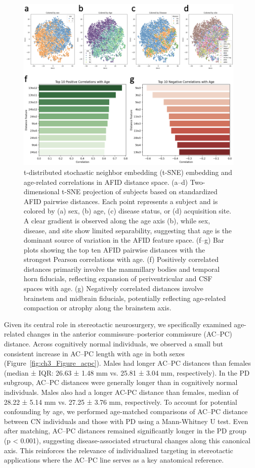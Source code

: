 \begin{figure}[hbt!]
    \centering
    \includegraphics[width=1\linewidth]{figs/ch3_Figure_tsne.png}
    \caption{t-distributed stochastic neighbor embedding (t-SNE) embedding and age-related correlations in AFID distance space. (a–d) Two-dimensional t-SNE projection of subjects based on standardized AFID pairwise distances. Each point represents a subject and is colored by (a) sex, (b) age, (c) disease status, or (d) acquisition site. A clear gradient is observed along the age axis (b), while sex, disease, and site show limited separability, suggesting that age is the dominant source of variation in the AFID feature space. (f–g) Bar plots showing the top ten AFID pairwise distances with the strongest Pearson correlations with age. (f) Positively correlated distances primarily involve the mammillary bodies and temporal horn fiducials, reflecting expansion of periventricular and CSF spaces with age. (g) Negatively correlated distances involve brainstem and midbrain fiducials, potentially reflecting age-related compaction or atrophy along the brainstem axis.
    }
    \label{fig:ch3_Figure_tsne}
\end{figure}

Given its central role in stereotactic neurosurgery, we specifically examined age-related changes in the anterior commissure–posterior commissure (AC–PC) distance. Across cognitively normal individuals, we observed a small but consistent increase in AC–PC length with age in both sexes (Figure~\ref{fig:ch3_Figure_acpc}). Males had longer AC–PC distances than females (median ± IQR: 26.63 ± 1.48 mm vs. 25.81 ± 3.04 mm, respectively). In the PD subgroup, AC–PC distances were generally longer than in cognitively normal individuals. Males also had a longer AC-PC distance than females, median of 28.22 ± 5.14 mm vs. 27.25 ± 3.76 mm, respectively. To account for potential confounding by age, we performed age-matched comparisons of AC–PC distance between CN individuals and those with PD using a Mann-Whitney U test. Even after matching, AC–PC distances remained significantly longer in the PD group (p < 0.001), suggesting disease-associated structural changes along this canonical axis. This reinforces the relevance of individualized targeting in stereotactic applications where the AC–PC line serves as a key anatomical reference.

